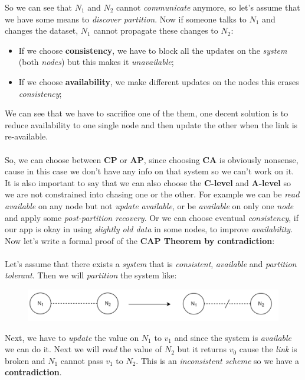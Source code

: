 \documentclass{article}
\begin{document}
So we can see that $N_1$ and $N_2$ cannot \emph{communicate} anymore, so let's assume that we have some means to \emph{discover partition}. Now if someone talks to $N_1$ and changes the dataset, $N_1$ cannot propagate these changes to $N_2$:
\begin{itemize}
\item If we choose \textbf{consistency}, we have to block all the updates on the \emph{system} (both \emph{nodes}) but this makes it \emph{unavailable};
\item If we choose \textbf{availability}, we make different updates on the nodes this erases \emph{consistency};
\end{itemize}
We can see that we have to sacrifice one of the them, one decent solution is to reduce availability to one single node and then update the other when the link is re-available.  \\\\
So, we can choose between \textbf{CP} or \textbf{AP}, since choosing \textbf{CA} is obviously nonsense, cause in this case we don't have any info on that system so we can't work on it. It is also important to say that we can also choose the \textbf{C-level} and \textbf{A-level} so we are not constrained into chasing one or the other. For example we can be \emph{read available} on any node but not \emph{update available}, or be \emph{available} on only one \emph{node} and apply some \emph{post-partition recovery}. Or we can choose eventual \emph{consistency}, if our app is okay in using \emph{slightly old data} in some nodes, to improve \emph{availability}. Now let's write a formal proof of the \textbf{CAP Theorem by contradiction}:\\\\
Let's assume that there exists a \emph{system} that is \emph{consistent}, \emph{available} and \emph{partition tolerant}. Then we will \emph{partition} the system like:
\begin{figure}[H]
  \centering
  \includegraphics[scale=0.95]{cattura78.png}
\end{figure}
Next, we have to \emph{update} the value on $N_1$ to $v_1$ and since the system is \emph{available} we can do it. Next we will \emph{read} the value of $N_2$ but it returns $v_0$ cause the \emph{link} is broken and $N_1$ cannot pass $v_1$ to $N_2$. This is an \emph{inconsistent scheme} so we have a \textbf{contradiction}. 
\clearpage
\end{document}
